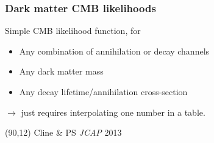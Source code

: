 \documentclass[xcolor=dvipsnames]{beamer}
\begin{document}
\begin{frame}
\frametitle{Dark matter CMB likelihoods}

Simple CMB likelihood function, for
\begin{itemize}
\item Any combination of annihilation or decay channels
\item Any dark matter mass 
\item Any decay lifetime/annihilation cross-section
\end{itemize}
$\rightarrow$ just requires interpolating one number in a table.\vspace{5mm}



\begin{textblock}{40}(90,12)
\tiny\color[rgb]{1, 1, 1}Cline \& PS \textit{JCAP} 2013\color[rgb]{0, 0, 0}
\end{textblock}

\end{frame}
\end{document}
